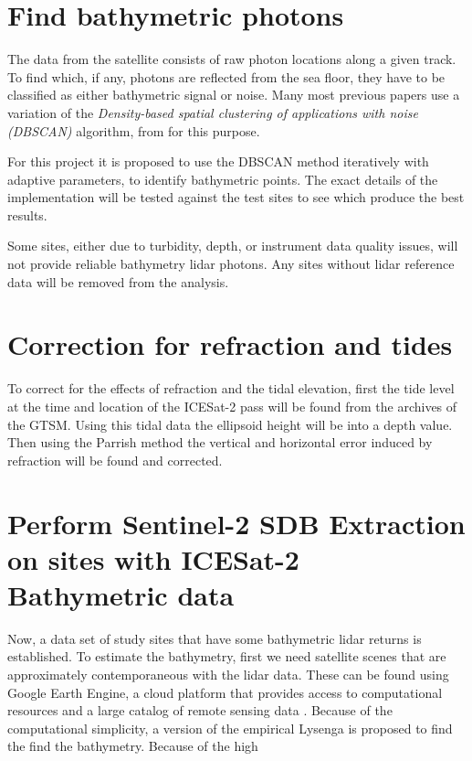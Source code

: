 \section{Find bathymetric photons}
The data from the satellite consists of raw photon locations along a given track. To find which, if any, photons are reflected from the sea floor, they have to be classified as either bathymetric signal or noise.
Many most previous papers use a variation of the \emph{Density-based spatial clustering of applications with noise (DBSCAN)} algorithm, from \citeauthor{Ester1996} for this purpose. 

For this project it is proposed to use the DBSCAN method iteratively with adaptive parameters, to identify bathymetric points. The exact details of the implementation will be tested against the test sites to see which produce the best results. 

Some sites, either due to turbidity, depth, or instrument data quality issues, will not provide reliable bathymetry lidar photons. Any sites without lidar reference data will be removed from the analysis.

\section{Correction for refraction and tides}
To correct for the effects of refraction and the tidal elevation, first the tide level at the time and location of the ICESat-2 pass will be found from the archives of the GTSM.  Using this tidal data the ellipsoid height will be into a depth value. Then using the Parrish method the vertical and horizontal error induced by refraction will be found and corrected.

\section{Perform Sentinel-2 SDB Extraction on sites with ICESat-2 Bathymetric data}
Now, a data set of study sites that have some bathymetric lidar returns is established. To estimate the bathymetry, first we need satellite scenes that are approximately contemporaneous with the lidar data. These can be found using Google Earth Engine, a cloud platform that provides access to computational resources and a large catalog of remote sensing data \parencite{Gorelick2017a}. Because of the computational simplicity, a version of the empirical Lysenga \parencite{add} is proposed to find the find the bathymetry. Because of the high 

